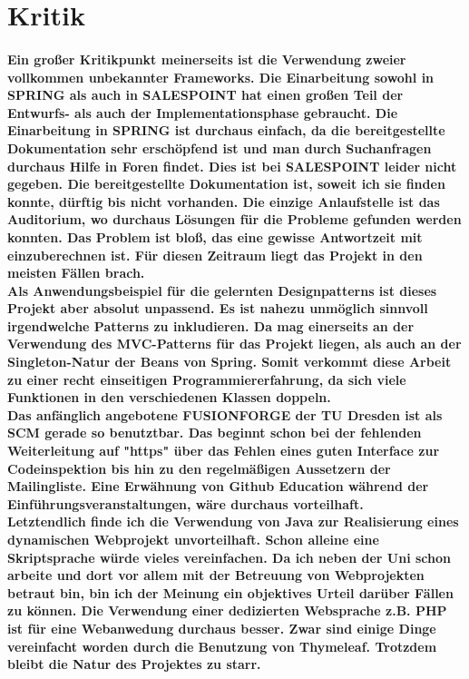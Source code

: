 \documentclass[a4paper]{article}
\begin{document}
\section{Kritik}

\paragraph{Ein großer Kritikpunkt meinerseits ist die Verwendung zweier vollkommen unbekannter Frameworks. Die Einarbeitung sowohl in SPRING als auch in SALESPOINT hat einen großen Teil der Entwurfs- als auch der Implementationsphase gebraucht. Die Einarbeitung in SPRING ist durchaus einfach, da die bereitgestellte Dokumentation sehr erschöpfend ist und man durch Suchanfragen durchaus Hilfe in Foren findet. Dies ist bei SALESPOINT leider nicht gegeben. Die bereitgestellte Dokumentation ist, soweit ich sie finden konnte, dürftig bis nicht vorhanden. Die einzige Anlaufstelle ist das Auditorium, wo durchaus Lösungen für die Probleme gefunden werden konnten. Das Problem ist bloß, das eine gewisse Antwortzeit mit einzuberechnen ist. Für diesen Zeitraum liegt das Projekt in den meisten Fällen brach.\\
Als Anwendungsbeispiel für die gelernten Designpatterns ist dieses Projekt aber absolut unpassend. Es ist nahezu unmöglich sinnvoll irgendwelche Patterns zu inkludieren. Da mag einerseits an der Verwendung des MVC-Patterns für das Projekt liegen, als auch an der Singleton-Natur der Beans von Spring. Somit verkommt diese Arbeit zu einer recht einseitigen Programmiererfahrung, da sich viele Funktionen in den verschiedenen Klassen doppeln.\\
Das anfänglich angebotene FUSIONFORGE der TU Dresden ist als SCM gerade so benutztbar. Das beginnt schon bei der fehlenden Weiterleitung auf "https" über das Fehlen eines guten Interface zur Codeinspektion bis hin zu den regelmäßigen Aussetzern der Mailingliste. Eine Erwähnung von Github Education während der Einführungsveranstaltungen, wäre durchaus vorteilhaft.\\
Letztendlich finde ich die Verwendung von Java zur Realisierung eines dynamischen Webprojekt unvorteilhaft. Schon alleine eine Skriptsprache würde vieles vereinfachen. Da ich neben der Uni schon arbeite und dort vor allem mit der Betreuung von Webprojekten betraut bin, bin ich der Meinung ein objektives Urteil darüber Fällen zu können. Die Verwendung einer dedizierten Websprache z.B. PHP ist für eine Webanwedung durchaus besser. Zwar sind einige Dinge vereinfacht worden durch die Benutzung von Thymeleaf. Trotzdem bleibt die Natur des Projektes zu starr.\\
}
\end{document}
